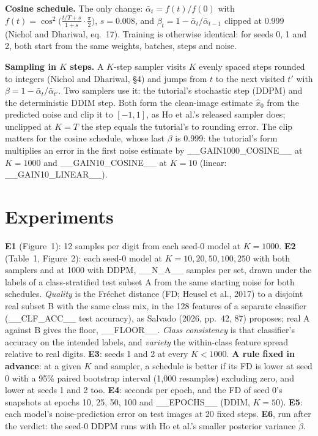 \documentclass[10pt,a4paper,twocolumn]{article}
\begin{document}
\textbf{Cosine schedule.} The only change: $\bar\alpha_t = f(t)/f(0)$ with
$f(t) = \cos^2\!\big(\tfrac{t/T + s}{1 + s}\cdot\tfrac{\pi}{2}\big)$, $s = 0.008$, and
$\beta_t = 1 - \bar\alpha_t/\bar\alpha_{t-1}$ clipped at 0.999 (Nichol and Dhariwal, eq.~17).
Training is otherwise identical: for seeds 0, 1 and 2, both start from the same weights,
batches, steps and noise.

\textbf{Sampling in $K$ steps.} A $K$-step sampler visits $K$ evenly spaced steps rounded to
integers (Nichol and Dhariwal, \S4) and jumps from $t$ to the next visited $t'$ with
$\beta = 1 - \bar\alpha_t/\bar\alpha_{t'}$. Two samplers use it: the tutorial's stochastic step
(DDPM) and the deterministic DDIM step. Both form the clean-image estimate $\hat x_0$ from the
predicted noise and clip it to $[-1, 1]$, as Ho et al.'s released sampler does; unclipped at
$K = T$ the step equals the tutorial's to rounding error. The clip matters for the cosine schedule,
whose last $\beta$ is 0.999: the tutorial's form multiplies an error in the first noise estimate by
__GAIN1000_COSINE__ at $K = 1000$ and __GAIN10_COSINE__ at $K = 10$ (linear: __GAIN10_LINEAR__).

\section{Experiments}
\textbf{E1} (Figure~1): 12 samples per digit from each seed-0 model at $K = 1000$.
\textbf{E2} (Table~1, Figure~2): each seed-0 model at $K = 10, 20, 50, 100, 250$ with both
samplers and at 1000 with DDPM, __N_A__ samples per set, drawn under the labels of a
class-stratified test subset A from the same starting noise for both schedules. \emph{Quality} is
the Fr\'echet distance (FD; Heusel et al., 2017) to a disjoint real subset B with the same class
mix, in the 128 features of a separate classifier (__CLF_ACC__ test accuracy), as Salvado (2026,
pp.~42, 87) proposes; real A against B gives the floor, __FLOOR__. \emph{Class consistency} is that
classifier's accuracy on the intended labels, and \emph{variety} the within-class feature spread
relative to real digits. \textbf{E3}: seeds 1 and 2 at every $K < 1000$. \textbf{A rule fixed in
advance}: at a given $K$ and sampler, a schedule is better if its FD is lower at seed 0 with a
95\% paired bootstrap interval (1,000 resamples) excluding zero, and lower at seeds 1 and 2 too.
\textbf{E4}: seconds per epoch, and the FD of seed 0's snapshots at epochs 10, 25, 50, 100 and
__EPOCHS__ (DDIM, $K = 50$). \textbf{E5}: each model's noise-prediction error on test images at 20
fixed steps. \textbf{E6}, run after the verdict: the seed-0 DDPM runs with Ho et al.'s smaller
posterior variance $\tilde\beta$.
\end{document}
